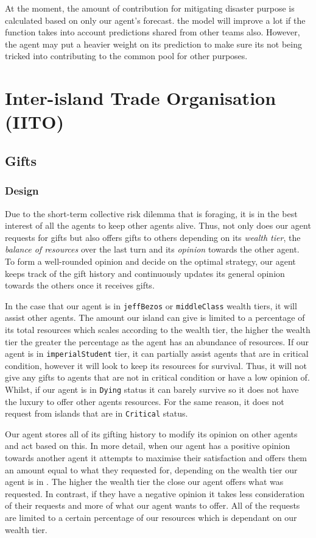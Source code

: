 At the moment, the amount of contribution for mitigating disaster purpose is calculated based on only our agent's forecast. the model will improve a lot if the function takes into account predictions shared from other teams also. However, the agent may put a heavier weight on its prediction to make sure its not being tricked into contributing to the common pool for other purposes. 


\section{Inter-island Trade Organisation (IITO)}
\subsection{Gifts}
\subsubsection{Design}
Due to the short-term collective risk dilemma that is foraging, it is in the best interest of all the agents to keep other agents alive. Thus, not only does our agent requests for gifts but also offers gifts to others depending on its \textit{wealth tier}, the \textit{balance of resources} over the last turn and its \textit{opinion} towards the other agent. To form a well-rounded opinion and decide on the optimal strategy, our agent keeps track of the gift history and continuously updates its general opinion towards the others once it receives gifts. \newline

In the case that our agent is in \texttt{jeffBezos} or \texttt{middleClass} wealth tiers, it will assist other agents. The amount our island can give is limited to a percentage of its total resources which scales according to the wealth tier, the higher the wealth tier the greater the percentage as the agent has an abundance of resources. If our agent is in \texttt{imperialStudent} tier, it can partially assist agents that are in critical condition, however it will look to keep its resources for survival. Thus, it will not give any gifts to agents that are not in critical condition or have a low opinion of. Whilst, if our agent is in \texttt{Dying} status it can barely survive so it does not have the luxury to offer other agents resources. For the same reason, it does not request from islands that are in \texttt{Critical} status.  \newline

Our agent stores all of its gifting history to modify its opinion on other agents and act based on this. In more detail, when our agent has a positive opinion towards another agent it attempts to maximise their satisfaction and offers them an amount equal to what they requested for, depending on the wealth tier our agent is in . The higher the wealth tier the close our agent offers what was requested. In contrast, if they have a negative opinion it takes less consideration of their requests and more of what our agent wants to offer. All of the requests are limited to a certain percentage of our resources which is dependant on our wealth tier. \newline

